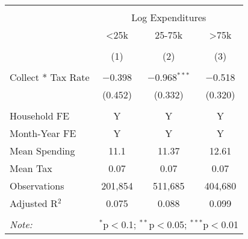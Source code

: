 
\begin{table}[!htbp] \centering 
  \caption{} 
  \label{} 
\begin{tabular}{@{\extracolsep{5pt}}lccc} 
\\[-1.8ex]\hline 
\hline \\[-1.8ex] 
 & \multicolumn{3}{c}{Log Expenditures} \\ 
\cline{2-4} 
 & <25k & 25-75k & >75k \\ 
\\[-1.8ex] & (1) & (2) & (3)\\ 
\hline \\[-1.8ex] 
 Collect * Tax Rate & $-$0.398 & $-$0.968$^{***}$ & $-$0.518 \\ 
  & (0.452) & (0.332) & (0.320) \\ 
 \hline \\[-1.8ex] 
Household FE & Y & Y & Y \\ 
Month-Year FE & Y & Y & Y \\ 
Mean Spending & 11.1 & 11.37 & 12.61 \\ 
Mean Tax & 0.07 & 0.07 & 0.07 \\ 
Observations & 201,854 & 511,685 & 404,680 \\ 
Adjusted R$^{2}$ & 0.075 & 0.088 & 0.099 \\ 
\hline 
\hline \\[-1.8ex] 
\textit{Note:}  & \multicolumn{3}{l}{$^{*}$p$<$0.1; $^{**}$p$<$0.05; $^{***}$p$<$0.01} \\ 
\end{tabular} 
\end{table} 
